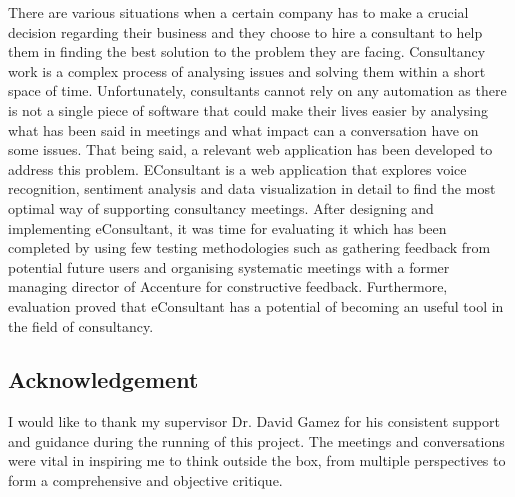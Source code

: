 \documentclass{article}
\begin{document}
{\large
There are various situations when a certain company has to make a crucial decision regarding their business and they choose to hire a consultant to help them in finding the best solution to the problem they are facing. Consultancy work is a complex process of analysing issues and solving them within a short space of time. Unfortunately, consultants cannot rely on any automation as there is not a single piece of software that could make their lives easier by analysing what has been said in meetings and what impact can a conversation have on some issues. That being said, a relevant web application has been developed to address this problem. EConsultant is a web application that explores voice recognition, sentiment analysis and data visualization in detail to find the most optimal way of supporting consultancy meetings. After designing and implementing eConsultant, it was time for evaluating it which has been completed by using few testing methodologies such as gathering feedback from potential future users and organising systematic meetings with a former managing director of Accenture for constructive feedback. Furthermore, evaluation proved that eConsultant has a potential of becoming an useful tool in the field of consultancy.\par
}

\newpage

\tableofcontents
  
\newpage
\listoffigures

\newpage

\begin{center}
\section*{Acknowledgement}
{\large 
I would like to thank my supervisor Dr. David Gamez for his consistent support and guidance during the running of this project. The meetings and conversations were vital in inspiring me to think outside the box, from multiple perspectives to form a comprehensive and objective critique.\par
}
\end{center}



\newpage
\end{document}
